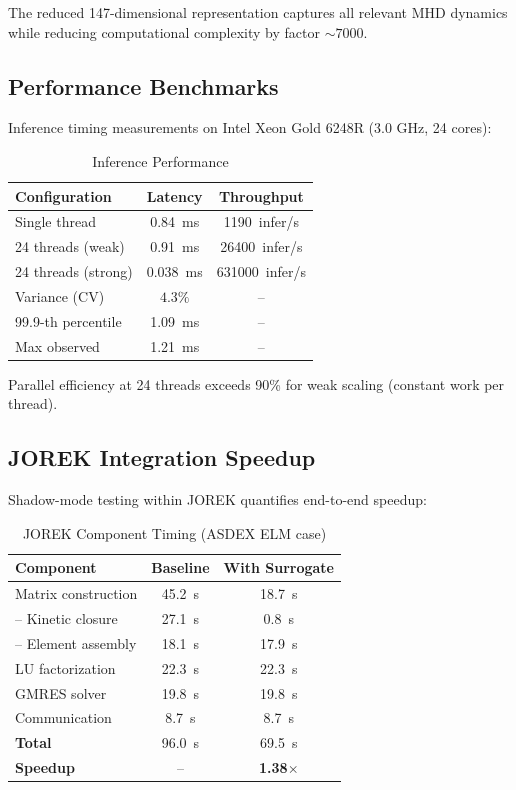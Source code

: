 \documentclass[12pt]{article}
\begin{document}
The reduced 147-dimensional representation captures all relevant MHD dynamics while reducing computational complexity by factor $\sim 7000$.

\subsection{Performance Benchmarks}

Inference timing measurements on Intel Xeon Gold 6248R (3.0 GHz, 24 cores):

\begin{table}[h]
\centering
\caption{Inference Performance}
\begin{tabular}{lcc}
\toprule
Configuration & Latency & Throughput \\
\midrule
Single thread & \SI{0.84}{\milli\second} & \SI{1190}{infer/s} \\
24 threads (weak) & \SI{0.91}{\milli\second} & \SI{26400}{infer/s} \\
24 threads (strong) & \SI{0.038}{\milli\second} & \SI{631000}{infer/s} \\
\midrule
Variance (CV) & $4.3\%$ & -- \\
99.9-th percentile & \SI{1.09}{\milli\second} & -- \\
Max observed & \SI{1.21}{\milli\second} & -- \\
\bottomrule
\end{tabular}
\end{table}

Parallel efficiency at 24 threads exceeds 90\% for weak scaling (constant work per thread).

\subsection{JOREK Integration Speedup}

Shadow-mode testing within JOREK quantifies end-to-end speedup:

\begin{table}[h]
\centering
\caption{JOREK Component Timing (ASDEX ELM case)}
\begin{tabular}{lcc}
\toprule
Component & Baseline & With Surrogate \\
\midrule
Matrix construction & \SI{45.2}{\second} & \SI{18.7}{\second} \\
\quad -- Kinetic closure & \SI{27.1}{\second} & \SI{0.8}{\second} \\
\quad -- Element assembly & \SI{18.1}{\second} & \SI{17.9}{\second} \\
LU factorization & \SI{22.3}{\second} & \SI{22.3}{\second} \\
GMRES solver & \SI{19.8}{\second} & \SI{19.8}{\second} \\
Communication & \SI{8.7}{\second} & \SI{8.7}{\second} \\
\midrule
\textbf{Total} & \SI{96.0}{\second} & \SI{69.5}{\second} \\
\textbf{Speedup} & -- & \textbf{1.38$\times$} \\
\bottomrule
\end{tabular}
\end{table}
\end{document}
